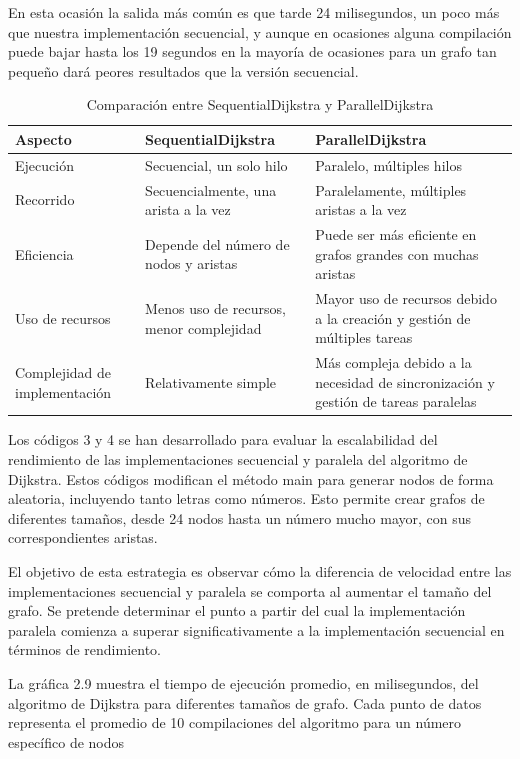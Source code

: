 En esta ocasión la salida más común es que tarde 24 milisegundos, un poco más que nuestra implementación secuencial, y aunque en ocasiones alguna compilación puede bajar hasta los 19 segundos en la mayoría de ocasiones para un grafo tan pequeño dará peores resultados que la versión secuencial. 
\begin{table}[h!]
\centering
\begin{tabular}{|p{2.5cm}|p{5cm}|p{5cm}|}
\hline
\textbf{Aspecto} & \textbf{SequentialDijkstra} & \textbf{ParallelDijkstra} \\
\hline
Ejecución & Secuencial, un solo hilo & Paralelo, múltiples hilos \\
\hline
Recorrido & Secuencialmente, una arista a la vez & Paralelamente, múltiples aristas a la vez \\
\hline
Eficiencia & Depende del número de nodos y aristas & Puede ser más eficiente en grafos grandes con muchas aristas \\
\hline
Uso de recursos & Menos uso de recursos, menor complejidad & Mayor uso de recursos debido a la creación y gestión de múltiples tareas \\
\hline
Complejidad de implementación & Relativamente simple & Más compleja debido a la necesidad de sincronización y gestión de tareas paralelas \\
\hline
\end{tabular}
\caption{Comparación entre SequentialDijkstra y ParallelDijkstra}
\label{table:comparison}
\end{table}

Los códigos 3 y 4 se han desarrollado para evaluar la escalabilidad del rendimiento de las implementaciones secuencial y paralela del algoritmo de Dijkstra. Estos códigos modifican el método main para generar nodos de forma aleatoria, incluyendo tanto letras como números. Esto permite crear grafos de diferentes tamaños, desde 24 nodos hasta un número mucho mayor, con sus correspondientes aristas.

El objetivo de esta estrategia es observar cómo la diferencia de velocidad entre las implementaciones secuencial y paralela se comporta al aumentar el tamaño del grafo. Se pretende determinar el punto a partir del cual la implementación paralela comienza a superar significativamente a la implementación secuencial en términos de rendimiento.

La gráfica 2.9 muestra el tiempo de ejecución promedio, en milisegundos, del algoritmo de Dijkstra para diferentes tamaños de grafo. Cada punto de datos representa el promedio de 10 compilaciones del algoritmo para un número específico de nodos


